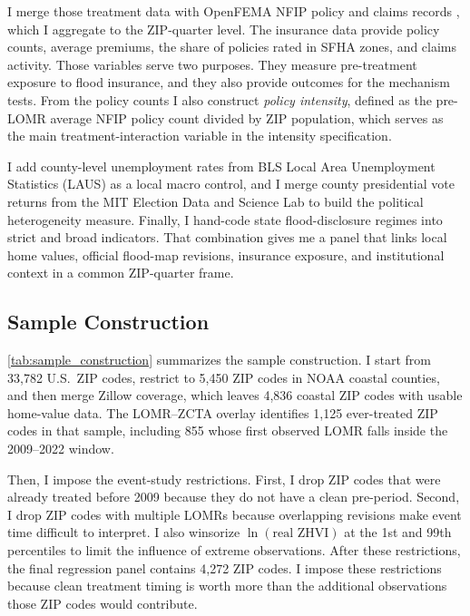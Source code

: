 \documentclass[12pt]{article}
\begin{document}
I merge those treatment data with OpenFEMA NFIP policy and claims records \citep{FEMA_NFIP}, which I aggregate to the ZIP-quarter level. The insurance data provide policy counts, average premiums, the share of policies rated in SFHA zones, and claims activity. Those variables serve two purposes. They measure pre-treatment exposure to flood insurance, and they also provide outcomes for the mechanism tests. From the policy counts I also construct \textit{policy intensity}, defined as the pre-LOMR average NFIP policy count divided by ZIP population, which serves as the main treatment-interaction variable in the intensity specification.

I add county-level unemployment rates from BLS Local Area Unemployment Statistics (LAUS) \citep{BLS_LAUS} as a local macro control, and I merge county presidential vote returns from the MIT Election Data and Science Lab \citep{MIT_MEDSL} to build the political heterogeneity measure. Finally, I hand-code state flood-disclosure regimes into strict and broad indicators. That combination gives me a panel that links local home values, official flood-map revisions, insurance exposure, and institutional context in a common ZIP-quarter frame.

\subsection{Sample Construction}\label{sec:data_sample}

\autoref{tab:sample_construction} summarizes the sample construction. I start from 33,782 U.S.\ ZIP codes, restrict to 5,450 ZIP codes in NOAA coastal counties, and then merge Zillow coverage, which leaves 4,836 coastal ZIP codes with usable home-value data. The LOMR--ZCTA overlay identifies 1,125 ever-treated ZIP codes in that sample, including 855 whose first observed LOMR falls inside the 2009--2022 window.

Then, I impose the event-study restrictions. First, I drop ZIP codes that were already treated before 2009 because they do not have a clean pre-period. Second, I drop ZIP codes with multiple LOMRs because overlapping revisions make event time difficult to interpret. I also winsorize $\ln(\text{real ZHVI})$ at the 1st and 99th percentiles to limit the influence of extreme observations. After these restrictions, the final regression panel contains 4,272 ZIP codes. I impose these restrictions because clean treatment timing is worth more than the additional observations those ZIP codes would contribute.
\end{document}
